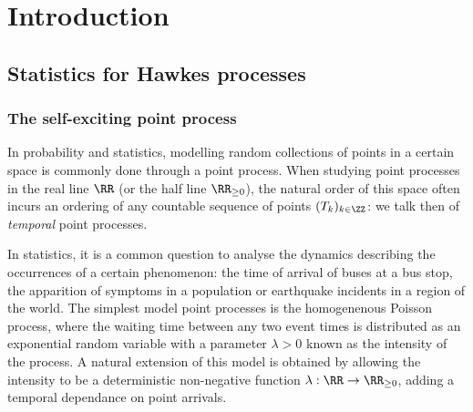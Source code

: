 
\chapter{Introduction}

\section{Statistics for Hawkes processes}\label{sec:chap0_introduction}
    \subsection{The self-exciting point process}
    In probability and statistics, modelling random collections of points in a certain space is commonly done through a point process.
    When studying point processes in the real line $\RR$ (or the half line $\RR_{\geq 0}$), the natural order of this space often incurs an ordering of any countable sequence of points $(T_k)_{k\in\ZZ}$: we talk then of \emph{temporal} point processes.

    In statistics, it is a common question to analyse the dynamics describing the occurrences of a certain phenomenon: the time of arrival of buses at a bus stop, the apparition of symptoms in a population or earthquake incidents in a region of the world.
    The simplest model point processes is the homogenenous Poisson process, where the waiting time between any two event times is distributed as an exponential random variable with a parameter $\lambda > 0$ known as the intensity of the process.
    A natural extension of this model is obtained by allowing the intensity to be a deterministic non-negative function $\lambda:\RR \to \RR_{\geq0}$, adding a temporal dependance on point arrivals.

